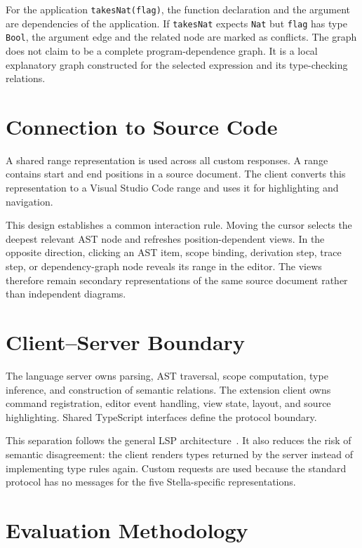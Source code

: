 For the application \texttt{takesNat(flag)}, the function declaration and the argument are dependencies of the application. If \texttt{takesNat} expects \texttt{Nat} but \texttt{flag} has type \texttt{Bool}, the argument edge and the related node are marked as conflicts. The graph does not claim to be a complete program-dependence graph. It is a local explanatory graph constructed for the selected expression and its type-checking relations.

\section{Connection to Source Code}

A shared range representation is used across all custom responses. A range contains start and end positions in a source document. The client converts this representation to a Visual Studio Code range and uses it for highlighting and navigation.

This design establishes a common interaction rule. Moving the cursor selects the deepest relevant AST node and refreshes position-dependent views. In the opposite direction, clicking an AST item, scope binding, derivation step, trace step, or dependency-graph node reveals its range in the editor. The views therefore remain secondary representations of the same source document rather than independent diagrams.

\section{Client--Server Boundary}

The language server owns parsing, AST traversal, scope computation, type inference, and construction of semantic relations. The extension client owns command registration, editor event handling, view state, layout, and source highlighting. Shared TypeScript interfaces define the protocol boundary.

This separation follows the general LSP architecture~\cite{MicrosoftLSP}. It also reduces the risk of semantic disagreement: the client renders types returned by the server instead of implementing type rules again. Custom requests are used because the standard protocol has no messages for the five Stella-specific representations.

\section{Evaluation Methodology}

